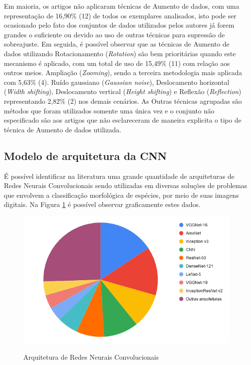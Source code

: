 \documentclass[
	12pt,				%
	oneside,			%
	a4paper,			%
	english,			%
	brazil				%
	]{abntex2ppgsi}
\begin{document}
Em maioria, os artigos não aplicaram técnicas de Aumento de dados, com uma representação de 16,90\% (12) de todos os exemplares analisados, isto pode ser ocasionado pelo fato dos conjuntos de dados utilizados pelos autores já forem grandes o suficiente ou devido ao uso de outras técnicas para supressão de sobreajuste. Em seguida, é possível observar que as técnicas de Aumento de dados utilizando Rotacionamento (\textit{Rotation}) são bem prioritárias quando este mecanismo é aplicado, com um total de uso de 15,49\% (11) com relação aos outros meios. Ampliação (\textit{Zooming}), sendo a terceira metodologia mais aplicada com 5,63\% (4). Ruído gaussiano (\textit{Gaussian noise}), Deslocamento horizontal (\textit{Width shifting}), Deslocamento vertical (\textit{Height shifting}) e Reflexão (\textit{Reflection}) representando 2,82\% (2) nos demais cenários. As Outras técnicas agrupadas são métodos que foram utilizados somente uma única vez e o conjunto não especificado são aos artigos que não esclareceram de maneira explicita o tipo de técnica de Aumento de dados utilizada.

\subsection{Modelo de arquitetura da CNN}

É possível identificar na literatura uma grande quantidade de arquiteturas de Redes Neurais Convolucionais sendo utilizadas em diversas soluções de problemas que envolvem a classificação morfológica de espécies, por meio de suas imagens digitais. Na Figura \ref{fig:grafico_arquitetura_vs_uso} é possível observar graficamente estes dados.

\begin{figure}[H]
    \centering
    \caption{Arquitetura de Redes Neurais Convolucionais}
    \includegraphics[scale=.60]{imagens/grafico_arquitetura_vs_uso.png}
    \label{fig:grafico_arquitetura_vs_uso}
\end{figure}
\end{document}
